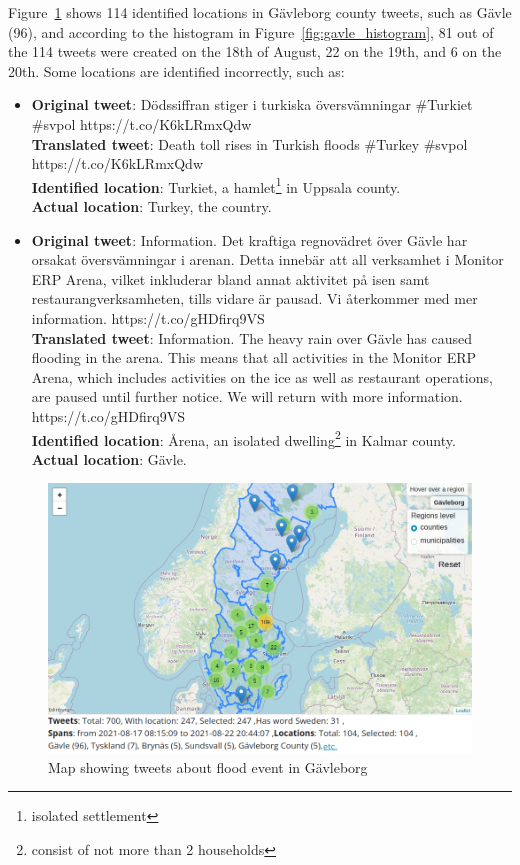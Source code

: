 Figure~\ref{fig:gavle_map} shows 114 identified locations in Gävleborg county tweets, such as Gävle (96), and
according to the histogram in Figure~\ref{fig:gavle_histogram}, 81 out of the 114 tweets were created on the 18th of August,
22 on the 19th, and 6 on the 20th. Some locations are identified incorrectly, such as:
\begin{itemize}
  \item \textbf{Original tweet}: Dödssiffran stiger i turkiska översvämningar \#Turkiet \#svpol
    https://t.co/K6kLRmxQdw \\
  \textbf{Translated tweet}: Death toll rises in Turkish floods \#Turkey \#svpol \\
    https://t.co/K6kLRmxQdw \\
    \textbf{Identified location}: Turkiet, a hamlet\footnote{isolated settlement} in Uppsala county. \\
    \textbf{Actual location}: Turkey, the country.

  \item \textbf{Original tweet}: Information. Det kraftiga regnovädret över Gävle har orsakat
    översvämningar i arenan. Detta innebär att all verksamhet i Monitor ERP Arena, vilket inkluderar
    bland annat aktivitet på isen samt restaurangverksamheten, tills vidare är pausad. Vi återkommer
    med mer information. https://t.co/gHDfirq9VS \\
    \textbf{Translated tweet}: Information. The heavy rain over Gävle has caused flooding in the arena.
    This means that all activities in the Monitor ERP Arena, which includes activities on the ice as
    well as restaurant operations, are paused until further notice. We will return with more
    information. https://t.co/gHDfirq9VS \\
    \textbf{Identified location}: Årena, an isolated dwelling\footnote{consist of not more than 2 households}
    in Kalmar county. \\
    \textbf{Actual location}: Gävle.


\end{itemize}

\begin{figure}[H]
  \begin{center}
    \includegraphics[width=\columnwidth]{./images/gavle_map.png}
  \end{center}
  \caption{Map showing tweets about flood event in Gävleborg}
  \label{fig:gavle_map}
\end{figure}

